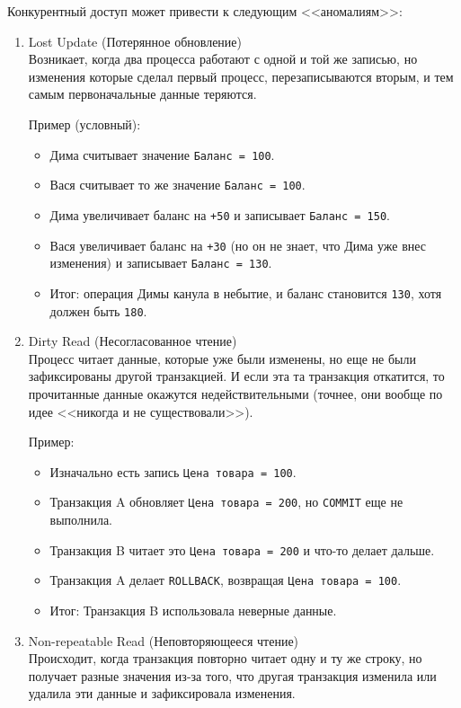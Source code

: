Конкурентный доступ может привести к следующим <<аномалиям>>:
\begin{enumerate}
    \item Lost Update (Потерянное обновление) ~\\
    Возникает, когда два процесса работают с одной и той же записью, но изменения которые сделал первый процесс, перезаписываются вторым, и тем самым первоначальные данные теряются.
    
    Пример (условный):
    \begin{itemize}
        \item Дима считывает значение \texttt{Баланс = 100}.
        \item Вася считывает то же значение \texttt{Баланс = 100}.
        \item Дима увеличивает баланс на \texttt{+50} и записывает \texttt{Баланс = 150}.
        \item Вася увеличивает баланс на \texttt{+30} (но он не знает, что Дима уже внес изменения) и записывает \texttt{Баланс = 130}.
        \item Итог: операция Димы канула в небытие, и баланс становится \texttt{130}, хотя должен быть \texttt{180}.
    \end{itemize}

    \item Dirty Read (Несогласованное чтение) ~\\
    Процесс читает данные, которые уже были изменены, но еще не были зафиксированы другой транзакцией. И если эта та транзакция откатится, то прочитанные данные окажутся недействительными (точнее, они вообще по идее <<никогда и не существовали>>).
    
    Пример:
    \begin{itemize}
        \item Изначально есть запись \texttt{Цена товара = 100}.
        \item Транзакция A обновляет \texttt{Цена товара = 200}, но \texttt{COMMIT} еще не выполнила.
        \item Транзакция B читает это \texttt{Цена товара = 200} и что-то делает дальше.
        \item Транзакция A делает \texttt{ROLLBACK}, возвращая \texttt{Цена товара = 100}.
        \item Итог: Транзакция B использовала неверные данные.
    \end{itemize}

    \item Non-repeatable Read (Неповторяющееся чтение) ~\\
    Происходит, когда транзакция повторно читает одну и ту же строку, но получает разные значения из-за того, что другая транзакция изменила или удалила эти данные и зафиксировала изменения.


\end{enumerate}
